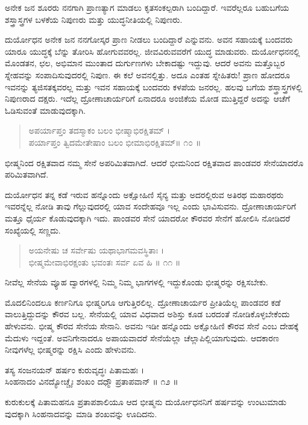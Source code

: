 {\small ಅನೇಕ ಜನ ಶೂರರು ನನಗಾಗಿ ಪ್ರಾಣತ್ಯಾಗ ಮಾಡಲು ಕೃತಸಂಕಲ್ಪರಾಗಿ ಬಂದಿದ್ದಾರೆ. ಇವರೆಲ್ಲರೂ ಬಹುಬಗೆಯ ಶಸ್ತ್ರಾಸ್ತ್ರಗಳ ಬಳಕೆಯ ನಿಪುಣರು ಮತ್ತು ಯುದ್ಧನೀತಿಯಲ್ಲಿ ನಿಪುಣರು.}

ದುರ್ಯೋಧನ ಅನೇಕ ಜನ ನನಗೋಸ್ಕರ ಪ್ರಾಣ ನೀಡಲು ಬಂದಿದ್ದಾರೆ ಎನ್ನುವನು. ಅವನ ಸಹಾಯಕ್ಕೆ ಬಂದವರು ಯಾರೂ ಯುದ್ಧಕ್ಕೆ ಬೆನ್ನು ತೋರಿಸಿ ಹೋಗುವವರಲ್ಲ. ಜೀವವಿರುವವರೆಗೆ ಯುದ್ಧ ಮಾಡುವರು. ದುರ್ಯೋಧನನಲ್ಲಿ ಮೊಂಡತನ, ಛಲ, ಅಭಿಮಾನ ಮುಂತಾದ ದುರ್ಗುಣಗಳು ಬೇಕಾದಷ್ಟು ಇದ್ದುವು. ಆದರೆ ಅವನು ಮತ್ತೊಬ್ಬರ ಸ್ನೇಹವನ್ನು ಸಂಪಾದಿಸುವುದರಲ್ಲಿ ನಿಪುಣ. ಈ ಕಲೆ ಅವನಲ್ಲಿತ್ತು. ಅದೂ ಎಂತಹ ಸ್ನೇಹಿತರು! ಪ್ರಾಣ ಹೋದರೂ ಇವನನ್ನು ತ್ಯಜಿಸತಕ್ಕವರಲ್ಲ ಮತ್ತು ಇವನ ಸಹಾಯಕ್ಕೆ ಬಂದವರು ಕಳಪೆಯ ಜನರಲ್ಲ. ಹಲವು ಬಗೆಯ ಶಸ್ತ್ರಾಸ್ತ್ರಗಳಲ್ಲಿ ನಿಪುಣರಾದ ದಕ್ಷರು. ಇದೆಲ್ಲ ದ್ರೋಣಾಚಾರ್ಯರಿಗೆ ಏನಾದರೂ ಅಂಜಿಕೆಯ ಮೋಡ ಮುತ್ತಿದ್ದರೆ ಅದನ್ನು ಆಚೆಗೆ ಓಡಿಸುವಂತೆ ಮಾಡುವುದಕ್ಕಾಗಿ.

\begin{verse}
ಅಪರ್ಯಾಪ್ತಂ ತದಸ್ಮಾಕಂ ಬಲಂ ಭೀಷ್ಮಾಭಿರಕ್ಷಿತಮ್ ।\\ಪರ್ಯಾಪ್ತಂ ತ್ವಿದಮೇತೇಷಾಂ ಬಲಂ ಭೀಮಾಭಿರಕ್ಷಿತಮ್\num{॥ ೧೦ ॥}
\end{verse}

{\small ಭೀಷ್ಮನಿಂದ ರಕ್ಷಿತವಾದ ನಮ್ಮ ಸೇನೆ ಅಪರಿಮಿತವಾಗಿದೆ. ಆದರೆ ಭೀಮನಿಂದ ರಕ್ಷಿತವಾದ ಪಾಂಡವರ ಸೇನೆಯಾದರೊ ಪರಿಮಿತವಾಗಿದೆ.}

ದುರ್ಯೋಧನ ತನ್ನ ಕಡೆ ಇರುವ ಹನ್ನೊಂದು ಅಕ್ಷೋಹಿಣಿ ಸೈನ್ಯ ಮತ್ತು ಅದರಲ್ಲಿರುವ ಅತಿರಥ ಮಹಾರಥರು ಇವರನ್ನೆಲ್ಲ ನೋಡಿ ತಾವು ಗೆಲ್ಲುವುದರಲ್ಲಿ ಯಾವ ಸಂದೇಹವೂ ಇಲ್ಲ ಎಂದು ಭಾವಿಸುವನು. ದ್ರೋಣಾಚಾರ್ಯರಿಗೆ ಮತ್ತೂ ಧೈರ್ಯ ಕೊಡುವುದಕ್ಕಾಗಿ ಇದು. ಪಾಂಡವರ ಸೇನೆ ಯಾದರೋ ಕೌರವರ ಸೇನೆಗೆ ಹೋಲಿಸಿ ನೋಡಿದರೆ ಸಂಖ್ಯೆಯಲ್ಲಿ ಸಣ್ಣದು.

\begin{verse}
ಅಯನೇಷು ಚ ಸರ್ವೇಷು ಯಥಾಭಾಗಮವಸ್ಥಿತಾಃ ।\\ಭೀಷ್ಮಮೇವಾಭಿರಕ್ಷಂತು ಭವಂತಃ ಸರ್ವ ಏವ ಹಿ \num{॥ ೧೧ ॥}
\end{verse}

{\small ನೀವೆಲ್ಲ ಸೇನೆಯ ವ್ಯೂಹ ದ್ವಾರಗಳಲ್ಲಿ ನಿಮ್ಮ ನಿಮ್ಮ ಭಾಗಗಳಲ್ಲಿ ಇದ್ದುಕೊಂಡು ಭೀಷ್ಮರನ್ನು ರಕ್ಷಿಸಬೇಕು.}

ಮೊದಲಿನಿಂದಲೂ ಕರ್ಣನಿಗೂ ಭೀಷ್ಮರಿಗೂ ಆಗುತ್ತಿರಲಿಲ್ಲ. ದ್ರೋಣಾಚಾರ್ಯರ ಪ್ರೀತಿಯೆಲ್ಲ ಪಾಂಡವರ ಕಡೆ ವಾಲುತ್ತಿದ್ದುದನ್ನು ಕೌರವ ಬಲ್ಲ. ಸೇನೆಯಲ್ಲಿ ಯಾವ ವಿಧವಾದ ಅಶಿಸ್ತು ಕೂಡ ಬರದಂತೆ ನೋಡಿಕೊಳ್ಳಬೇಕೆಂದು ಹೇಳುವನು. ಭೀಷ್ಮ ಕೌರವ ಸೇನೆಯ ಸೇನಾನಿ. ಅವನು ಇಡೀ ಹನ್ನೊಂದು ಅಕ್ಷೋಹಿಣಿ ಕೌರವ ಸೇನೆ ಎಂಬ ದೇಹಕ್ಕೆ ಮೆದುಳು ಇದ್ದಂತೆ. ಅವನಿಗೇನಾದರೂ ಅಪಾಯವಾದರೆ ಸೇನೆಯೆಲ್ಲಾ ಚೆಲ್ಲಾಪಿಲ್ಲಿಯಾಗುವುದು. ಆದಕಾರಣ ನೀವುಗಳೆಲ್ಲ ಭೀಷ್ಮರನ್ನು ರಕ್ಷಿಸಿ ಎಂದು ಹೇಳುವನು.

ತಸ್ಯ ಸಂಜನಯನ್ ಹರ್ಷಂ ಕುರುವೃದ್ಧಃ ಪಿತಾಮಹಃ ।\\ಸಿಂಹನಾದಂ ವಿನದ್ಯೋಚ್ಚೈಃ ಶಂಖಂ ದಧ್ಮೌ ಪ್ರತಾಪವಾನ್ \num{॥ ೧೨ ॥}

{\small ಕುರುಕುಲಕ್ಕೆ ಪಿತಾಮಹನೂ ಪ್ರತಾಪಶಾಲಿಯೂ ಆದ ಭೀಷ್ಮನು ದುರ್ಯೋಧನನಿಗೆ ಹರ್ಷವನ್ನು ಉಂಟುಮಾಡು ವುದಕ್ಕಾಗಿ ಸಿಂಹನಾದವನ್ನು ಮಾಡಿ ಶಂಖವನ್ನು ಊದಿದನು.}

